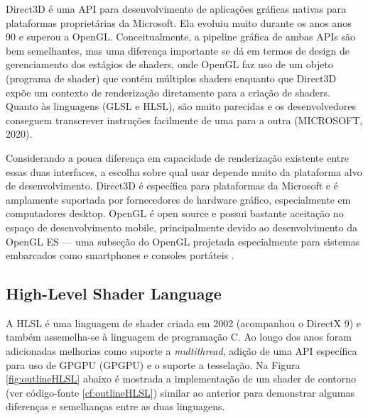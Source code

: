 Direct3D é uma API para desenvolvimento de aplicações gráficas nativas para plataformas proprietárias da Microsoft. Ela evoluiu muito durante os anos anos 90 e superou a OpenGL. Conceitualmente, a pipeline gráfica de ambas APIs são bem semelhantes, mas uma diferença importante se dá em termos de design de gerenciamento dos estágios de shaders, onde OpenGL faz uso de um objeto (programa de shader) que contém múltiplos shaders enquanto que Direct3D expõe um contexto de renderização diretamente para a criação de shaders. Quanto às linguagens (GLSL e HLSL), são muito parecidas e os desenvolvedores conseguem transcrever instruções facilmente de uma para a outra (MICROSOFT, 2020)\nocite{Direct3D}.

Considerando a pouca diferença em capacidade de renderização existente entre essas duas interfaces, a escolha sobre qual usar depende muito da plataforma alvo de desenvolvimento. Direct3D é específica para plataformas da Microsoft e é amplamente suportada por fornecedores de hardware gráfico, especialmente em computadores desktop. OpenGL é open source e possui bastante aceitação no espaço de desenvolvimento mobile, principalmente devido ao desenvolvimento da OpenGL ES --- uma subseção do OpenGL projetada especialmente para sistemas embarcados como smartphones e consoles portáteis \cite{HLSLBook}.

\subsection{High-Level Shader Language}
\label{sec:hlsl}

A HLSL é uma linguagem de shader criada em 2002 (acompanhou o DirectX 9) e também assemelha-se à linguagem de programação C. Ao longo dos anos foram adicionadas melhorias como suporte a \textit{\Gls{multithread}}, adição de uma API específica para uso de GPGPU (\acrlong{GPGPU}) e o suporte a tesselação. Na Figura \ref{fig:outlineHLSL} abaixo é mostrada a implementação de um shader de contorno (ver código-fonte \ref{cf:outlineHLSL}) similar ao anterior para demonstrar algumas diferenças e semelhanças entre as duas linguagens.

	\begin{figure}[h!]
		\centering
	\end{figure}

